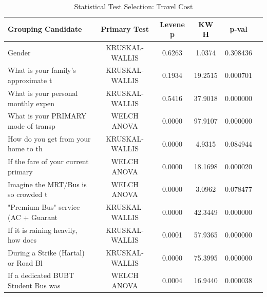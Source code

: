 \begin{table}[htbp]
\centering
\caption{Statistical Test Selection: Travel Cost}
\label{tab:analysis_01_travel_cost}
\begin{tabular}{lccccc}
\hline
\textbf{Grouping Candidate} & \textbf{Primary Test} & \textbf{Levene p} & \textbf{KW H} & \textbf{p-val} \\
\hline
Gender & KRUSKAL-WALLIS & 0.6263 & 1.0374 & 0.308436 \\
What is your family's approximate t & KRUSKAL-WALLIS & 0.1934 & 19.2515 & 0.000701 \\
What is your personal monthly expen & KRUSKAL-WALLIS & 0.5416 & 37.9018 & 0.000000 \\
What is your PRIMARY mode of transp & WELCH ANOVA & 0.0000 & 97.9107 & 0.000000 \\
How do you get from your home to th & KRUSKAL-WALLIS & 0.0000 & 4.9315 & 0.084944 \\
If the fare of your current primary & WELCH ANOVA & 0.0000 & 18.1698 & 0.000020 \\
Imagine the MRT/Bus is so crowded t & WELCH ANOVA & 0.0000 & 3.0962 & 0.078477 \\
"Premium Bus" service (AC + Guarant & KRUSKAL-WALLIS & 0.0000 & 42.3449 & 0.000000 \\
If it is raining heavily, how does  & KRUSKAL-WALLIS & 0.0001 & 57.9365 & 0.000000 \\
During a Strike (Hartal) or Road Bl & KRUSKAL-WALLIS & 0.0000 & 75.3995 & 0.000000 \\
If a dedicated BUBT Student Bus was & WELCH ANOVA & 0.0004 & 16.9440 & 0.000038 \\
\hline
\end{tabular}
\end{table}
